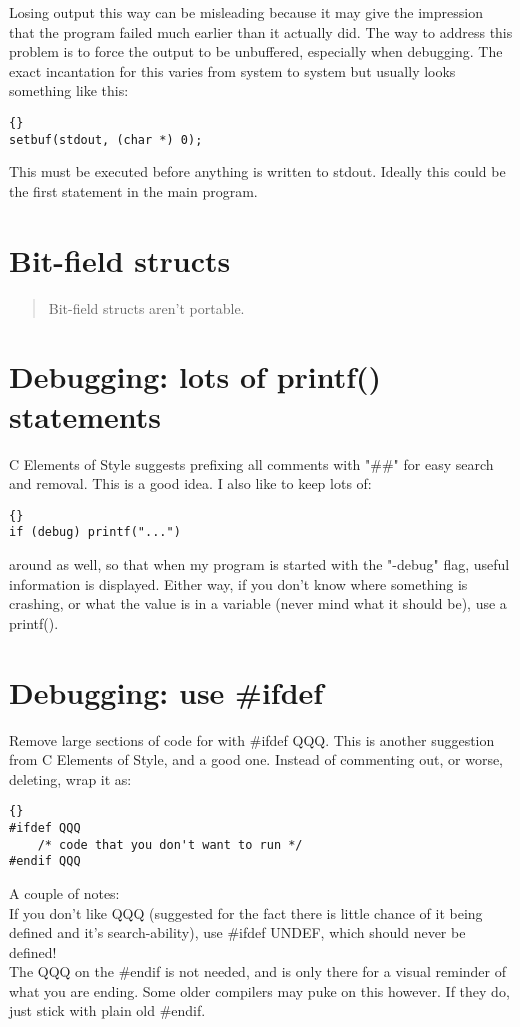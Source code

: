 \documentclass{report}
\begin{document}
Losing output this way can be misleading because it may give the impression that the program failed much earlier than it actually did. The way to address this problem is to force the output to be unbuffered, especially when debugging. The exact incantation for this varies from system to system but usually looks something like this: 
\begin{lstlisting}{}
setbuf(stdout, (char *) 0);
\end{lstlisting}
 This must be executed before anything is written to stdout. Ideally this could be the first statement in the main program.

\section{Bit-field structs}
\begin{quote}
Bit-field structs aren't portable.
\end{quote}


\section{Debugging: lots of printf() statements}
C Elements of Style suggests prefixing all comments with "\#\#" for easy search and removal.
This is a good idea. I also like to keep lots of:
\begin{lstlisting}{}
if (debug) printf("...")
\end{lstlisting}
around as well, so that when my program is started with the "-debug" flag, useful information is displayed. 
Either way, if you don't know where something is crashing, or what the value is in a variable (never mind what it should be), use a printf(). 

\section{Debugging: use \#ifdef}
Remove large sections of code for with \#ifdef QQQ. This is another suggestion from C Elements of Style, and a good one.
Instead of commenting out, or worse, deleting, wrap it as: 
\begin{lstlisting}{}
#ifdef QQQ
    /* code that you don't want to run */
#endif QQQ
\end{lstlisting}
A couple of notes:\\ 
If you don't like QQQ (suggested for the fact there is little chance of it being defined and it's search-ability), use \#ifdef UNDEF, which should never be defined!\\ 
The QQQ on the \#endif is not needed, and is only there for a visual reminder of what you are ending. Some older compilers may puke on this however. If they do, just stick with plain old \#endif.
\end{document}
